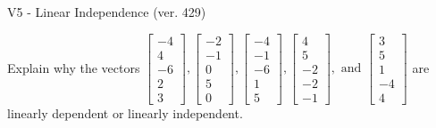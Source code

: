 \begin{exercise}
  \begin{exerciseTitle}V5 - Linear Independence (ver. 429)\end{exerciseTitle}
  \begin{exerciseStatement}
    Explain why the vectors \(\left[\begin{array}{r}
-4 \\
4 \\
-6 \\
2 \\
3
\end{array}\right] , \left[\begin{array}{r}
-2 \\
-1 \\
0 \\
5 \\
0
\end{array}\right] , \left[\begin{array}{r}
-4 \\
-1 \\
-6 \\
1 \\
5
\end{array}\right] , \left[\begin{array}{r}
4 \\
5 \\
-2 \\
-2 \\
-1
\end{array}\right] , \text{ and } \left[\begin{array}{r}
3 \\
5 \\
1 \\
-4 \\
4
\end{array}\right]\) are linearly dependent or linearly independent.	



\end{exerciseStatement}
\end{exercise}
